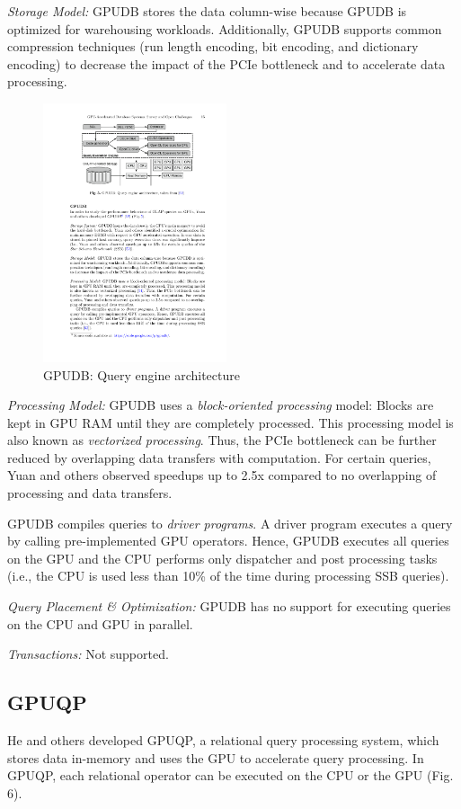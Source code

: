 \documentclass[twocolumn]{article}
\begin{document}
\noindent
\textit{Storage Model:}
 GPUDB stores the data column-wise because GPUDB is optimized for warehousing workloads. Additionally, GPUDB supports common compression techniques (run length encoding, bit encoding, and dictionary encoding) to decrease the impact of the PCIe bottleneck and to accelerate data processing.
\begin{figure}[htb]
        \centering
        \includegraphics[width=0.48\textwidth]{gpudb.pdf}
        \caption{GPUDB: Query engine architecture}
        \label{fig:gpudb}
\end{figure}

\noindent
\textit{Processing Model:}
GPUDB uses a \textit{block-oriented processing} model: Blocks are kept in GPU RAM until they are completely processed. This processing model is also known as \textit{vectorized processing}. Thus, the PCIe bottleneck can be further reduced by overlapping data transfers with computation. For certain queries, Yuan and others observed speedups up to 2.5x compared to no overlapping of processing and data transfers.

GPUDB compiles queries to \textit{driver programs}. A driver program executes a query by calling pre-implemented GPU operators. Hence, GPUDB executes all queries on the GPU and the CPU performs only dispatcher and post processing tasks (i.e., the CPU is used less than 10\% of the time during processing SSB queries).

\noindent
\textit{Query Placement \& Optimization:} GPUDB has no support for executing queries on the CPU and GPU in parallel.

\noindent
\textit{Transactions:} Not supported.


\subsection{GPUQP}
He and others developed GPUQP, a relational query processing system, which stores data in-memory and uses the GPU to accelerate query processing. In GPUQP, each relational operator can be executed on the CPU or the GPU (Fig. 6).
\end{document}

